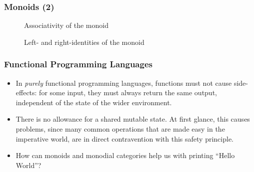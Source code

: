 \documentclass{beamer}
\numberwithin{figure}{section}
\DeclareMathOperator{\catid}{id}
\begin{document}
\begin{frame}
        \frametitle{Monoids (2)}
        \begin{figure}
                \caption{Associativity of the monoid}
        \end{figure}

        \vfill
        \pause
        \begin{figure}
                \caption{Left- and right-identities of the monoid}
        \end{figure}
\end{frame}

\begin{frame}
        \frametitle{Functional Programming Languages}
        \begin{itemize}
                \item In \textit{purely} functional programming languages,
                        functions must not cause side-effects: for some input,
                        they must always return the same output, independent of
                        the state of the wider environment.
                \item There is no allowance for a shared mutable state. At first
                        glance, this causes problems, since many common
                        operations that are made easy in the imperative world,
                        are in direct contravention with this safety principle.
                \item How can monoids and monodial categories help us with
                        printing ``Hello World''?
        \end{itemize}
\end{frame}
\end{document}
